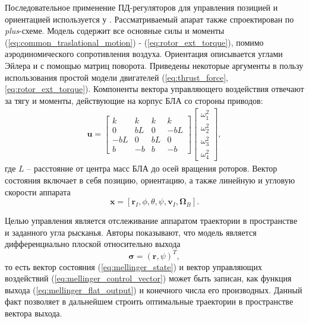 Последовательное применение ПД-регуляторов для управления позицией и ориентацией используется  у \cite{Mellinger01}. Рассматриваемый апарат также спроектирован по \textit{plus}-схеме. Модель содержит все основные силы и моменты
(\ref{eq:common_traslational_motion}) - (\ref{eq:rotor_ext_torque}),
помимо аэродиномического сопротивления воздуха.
Ориентация описывается углами Эйлера и с помощью матриц поворота.
Приведены некоторые аргументы в пользу использования простой модели двигателей
(\ref{eq:thrust_force}, \ref{eq:rotor_ext_torque}).
Компоненты вектора управляющего воздействия отвечают за тягу и моменты, действующие на корпус БЛА со стороны приводов:
\begin{equation} \label{eq:mellinger_control_vector}
	\begin{aligned}
	\bm{u} =
	\begin{bmatrix}
	k & k & k & k\\
	0 & bL & 0 & -bL\\
	-bL & 0 & bL & 0\\
	b & -b & b & -b
	\end{bmatrix}
	\begin{bmatrix}
	\omega^{2}_{1}\\
	\omega^{2}_{2}\\
	\omega^{2}_{3}\\
	\omega^{2}_{4}
	\end{bmatrix},
	\end{aligned}
\end{equation}
где $L$ -- расстояние от центра масс БЛА до осей вращения роторов.
Вектор состояния включает в себя позицию, ориентацию, а также линейную и угловую скорости аппарата
\begin{equation} \label{eq:mellinger_state}
\bm{x} = [\bm{r}_I, \phi, \theta, \psi, \bm{v}_I, \bm{\Omega}_B].
\end{equation}

Целью управления является отслеживание аппаратом траектории в пространстве и заданного угла рысканья. Авторы показывают, что модель является дифференциально плоской \cite{Belinskaya01, Nieuwstadt01} относительно выхода
\begin{equation} \label{eq:mellinger_flat_output}
\bm{\sigma} = (\bm{r},\psi)^T,
\end{equation}
то есть вектор состояния (\ref{eq:mellinger_state}) и вектор управляющих воздействий (\ref{eq:mellinger_control_vector}) может быть записан, как функция выхода  (\ref{eq:mellinger_flat_output}) и конечного числа его производных. Данный факт позволяет в дальнейшем строить оптимальные траектории в пространстве вектора выхода.

